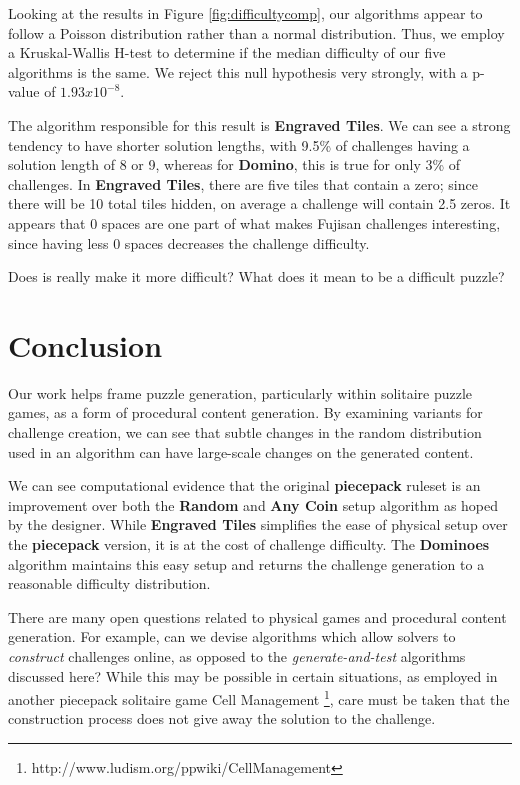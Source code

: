 \documentclass[10pt,journal,compsoc]{IEEEtran}
\begin{document}
Looking at the results in Figure \ref{fig:difficultycomp}, our algorithms appear to follow a Poisson distribution rather than a normal distribution.
Thus, we employ a Kruskal-Wallis H-test \cite{KRUSKAL} to determine if the median difficulty of our five algorithms is the same. We reject this null hypothesis very strongly, with a p-value of $1.93 x 10^{-8}$.

The algorithm responsible for this result is {\bf Engraved Tiles}. We can see a strong tendency to have shorter solution lengths, with 9.5\% of challenges having a solution length of 8 or 9, whereas for {\bf Domino}, this is true for only 3\% of challenges. In {\bf Engraved Tiles}, there are five tiles that contain a zero; since there will be 10 total tiles hidden, on average a challenge will contain 2.5 zeros. It appears that 0 spaces are one part of what makes Fujisan challenges interesting, since having less 0 spaces decreases the challenge difficulty.


Does is really make it more difficult? What does it mean to be a difficult puzzle?




\phantom{}


\section{Conclusion}   \label{sec:Conclusion}

\noindent

Our work helps frame puzzle generation, particularly within solitaire puzzle games, as a form of procedural content generation. By examining variants for challenge creation, we can see that subtle changes in the random distribution used in an algorithm can have large-scale changes on the generated content.

We can see computational evidence that the original {\bf piecepack} ruleset is an improvement over both the {\bf Random} and {\bf Any Coin} setup algorithm as hoped by the designer. While {\bf Engraved Tiles} simplifies the ease of physical setup over the {\bf piecepack} version, it is at the cost of challenge difficulty. The {\bf Dominoes} algorithm maintains this easy setup and returns the challenge generation to a reasonable difficulty distribution.

There are many open questions related to physical games and procedural content generation. For example, can we devise algorithms which allow solvers to {\it construct} challenges online, as opposed to the {\it generate-and-test} algorithms discussed here? While this may be possible in certain situations, as employed in another piecepack solitaire game Cell Management \footnote{http://www.ludism.org/ppwiki/CellManagement}, care must be taken that the construction process does not give away the solution to the challenge.
\end{document}
